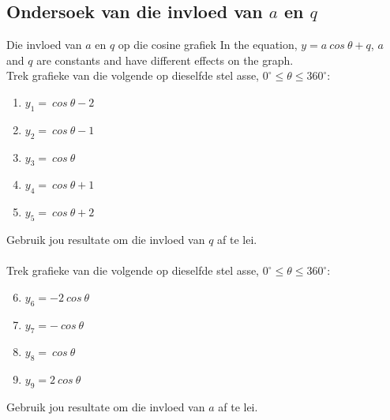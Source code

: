 \subsection*{Ondersoek van die invloed van $a$ en $q$}
\nopagebreak
\begin{Investigation}{Die invloed van $a$ en $q$ op die cosine grafiek}
In the equation, $y=a~cos~\theta+q$, $a$ and $q$ are constants and have different effects on the graph.\\

Trek grafieke van die volgende op dieselfde stel asse, $0^{\circ} \leq \theta \leq 360^{\circ}$:
\begin{enumerate}[noitemsep, label=\textbf{\arabic*}. ] 
\item $y_1=~cos~\theta -2$
\item $y_2=~cos~\theta -1$
\item $y_3=~cos~\theta $
\item $y_4=~cos~\theta +1$
\item $y_5=~cos~\theta +2$
\end{enumerate}
Gebruik jou resultate om die invloed van $q$ af te lei.\\
\\
Trek grafieke van die volgende op dieselfde stel asse, $0^{\circ} \leq \theta \leq 360^{\circ}$:
\begin{enumerate}[noitemsep, label=\textbf{\arabic*}. ] 
\setcounter{enumi}{5}
\item $y_6=-2~cos~\theta $
\item $y_7=-~cos~\theta $
\item $y_8=~cos~\theta $
\item $y_9=2~cos~\theta $\end{enumerate}
Gebruik jou resultate om die invloed van $a$ af te lei.
\end{Investigation}

